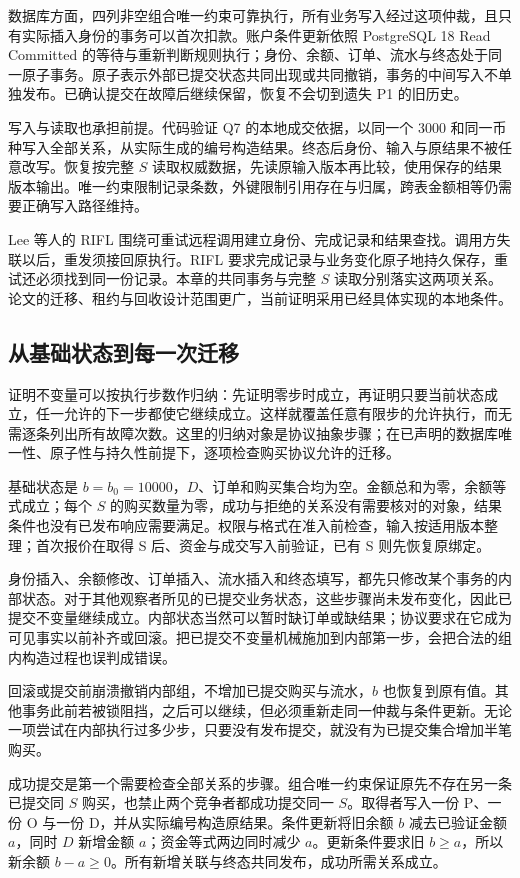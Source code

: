 数据库方面，四列非空组合唯一约束可靠执行，所有业务写入经过这项仲裁，且只有实际插入身份的事务可以首次扣款。账户条件更新依照 PostgreSQL 18 Read Committed 的等待与重新判断规则执行；身份、余额、订单、流水与终态处于同一原子事务。原子表示外部已提交状态共同出现或共同撤销，事务的中间写入不单独发布。已确认提交在故障后继续保留，恢复不会切到遗失 P1 的旧历史。

写入与读取也承担前提。代码验证 Q7 的本地成交依据，以同一个 3000 和同一币种写入全部关系，从实际生成的编号构造结果。终态后身份、输入与原结果不被任意改写。恢复按完整 \(S\) 读取权威数据，先读原输入版本再比较，使用保存的结果版本输出。唯一约束限制记录条数，外键限制引用存在与归属，跨表金额相等仍需要正确写入路径维持。

Lee 等人的 RIFL 围绕可重试远程调用建立身份、完成记录和结果查找\cite{rifl}。调用方失联以后，重发须接回原执行。RIFL 要求完成记录与业务变化原子地持久保存，重试还必须找到同一份记录。本章的共同事务与完整 \(S\) 读取分别落实这两项关系。论文的迁移、租约与回收设计范围更广，当前证明采用已经具体实现的本地条件。

\subsection*{从基础状态到每一次迁移}

证明不变量可以按执行步数作归纳：先证明零步时成立，再证明只要当前状态成立，任一允许的下一步都使它继续成立。这样就覆盖任意有限步的允许执行，而无需逐条列出所有故障次数。这里的归纳对象是协议抽象步骤；在已声明的数据库唯一性、原子性与持久性前提下，逐项检查购买协议允许的迁移。

基础状态是 \(b=b_0=10000\)，\(D\)、订单和购买集合均为空。金额总和为零，余额等式成立；每个 \(S\) 的购买数量为零，成功与拒绝的关系没有需要核对的对象，结果条件也没有已发布响应需要满足。权限与格式在准入前检查，输入按适用版本整理；首次报价在取得 S 后、资金与成交写入前验证，已有 S 则先恢复原绑定。

身份插入、余额修改、订单插入、流水插入和终态填写，都先只修改某个事务的内部状态。对于其他观察者所见的已提交业务状态，这些步骤尚未发布变化，因此已提交不变量继续成立。内部状态当然可以暂时缺订单或缺结果；协议要求在它成为可见事实以前补齐或回滚。把已提交不变量机械施加到内部第一步，会把合法的组内构造过程也误判成错误。

回滚或提交前崩溃撤销内部组，不增加已提交购买与流水，\(b\) 也恢复到原有值。其他事务此前若被锁阻挡，之后可以继续，但必须重新走同一仲裁与条件更新。无论一项尝试在内部执行过多少步，只要没有发布提交，就没有为已提交集合增加半笔购买。

成功提交是第一个需要检查全部关系的步骤。组合唯一约束保证原先不存在另一条已提交同 \(S\) 购买，也禁止两个竞争者都成功提交同一 \(S\)。取得者写入一份 P、一份 O 与一份 D，并从实际编号构造原结果。条件更新将旧余额 \(b\) 减去已验证金额 \(a\)，同时 \(D\) 新增金额 \(a\)；资金等式两边同时减少 \(a\)。更新条件要求旧 \(b\geq a\)，所以新余额 \(b-a\geq0\)。所有新增关联与终态共同发布，成功所需关系成立。

